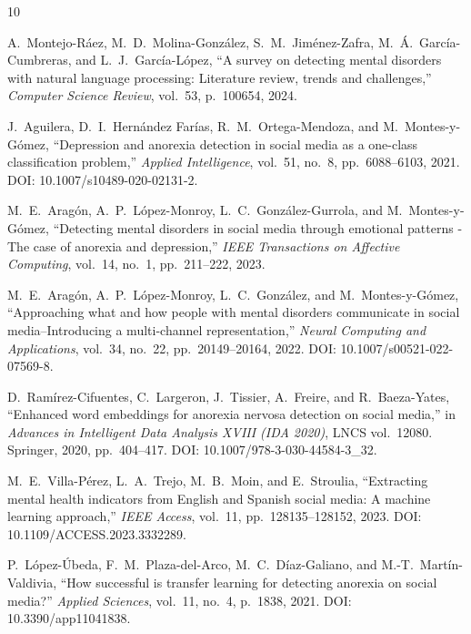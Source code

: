 \documentclass[journal]{IEEEtran}
\begin{document}
\begin{thebibliography}{10}

A.~Montejo-R\'aez, M.~D.~Molina-Gonz\'alez, S.~M.~Jim\'enez-Zafra, M.~\'A.~Garc\'ia-Cumbreras, and L.~J.~Garc\'ia-L\'opez, ``A survey on detecting mental disorders with natural language processing: Literature review, trends and challenges,'' \emph{Computer Science Review}, vol.~53, p.~100654, 2024.

J.~Aguilera, D.~I.~Hern\'andez Far\'ias, R.~M.~Ortega-Mendoza, and M.~Montes-y-G\'omez, ``Depression and anorexia detection in social media as a one-class classification problem,'' \emph{Applied Intelligence}, vol.~51, no.~8, pp.~6088--6103, 2021. DOI: 10.1007/s10489-020-02131-2.

M.~E.~Arag\'on, A.~P.~L\'opez-Monroy, L.~C.~Gonz\'alez-Gurrola, and M.~Montes-y-G\'omez, ``Detecting mental disorders in social media through emotional patterns - The case of anorexia and depression,'' \emph{IEEE Transactions on Affective Computing}, vol.~14, no.~1, pp.~211--222, 2023.

M.~E.~Arag\'on, A.~P.~L\'opez-Monroy, L.~C.~Gonz\'alez, and M.~Montes-y-G\'omez, ``Approaching what and how people with mental disorders communicate in social media--Introducing a multi-channel representation,'' \emph{Neural Computing and Applications}, vol.~34, no.~22, pp.~20149--20164, 2022. DOI: 10.1007/s00521-022-07569-8.

D.~Ram\'irez-Cifuentes, C.~Largeron, J.~Tissier, A.~Freire, and R.~Baeza-Yates, ``Enhanced word embeddings for anorexia nervosa detection on social media,'' in \emph{Advances in Intelligent Data Analysis XVIII (IDA 2020)}, LNCS vol.~12080. Springer, 2020, pp.~404--417. DOI: 10.1007/978-3-030-44584-3\_32.

M.~E.~Villa-P\'erez, L.~A.~Trejo, M.~B.~Moin, and E.~Stroulia, ``Extracting mental health indicators from English and Spanish social media: A machine learning approach,'' \emph{IEEE Access}, vol.~11, pp.~128135--128152, 2023. DOI: 10.1109/ACCESS.2023.3332289.

P.~L\'opez-\'Ubeda, F.~M.~Plaza-del-Arco, M.~C.~D\'iaz-Galiano, and M.-T.~Mart\'in-Valdivia, ``How successful is transfer learning for detecting anorexia on social media?'' \emph{Applied Sciences}, vol.~11, no.~4, p.~1838, 2021. DOI: 10.3390/app11041838.


\end{thebibliography}
\end{document}
